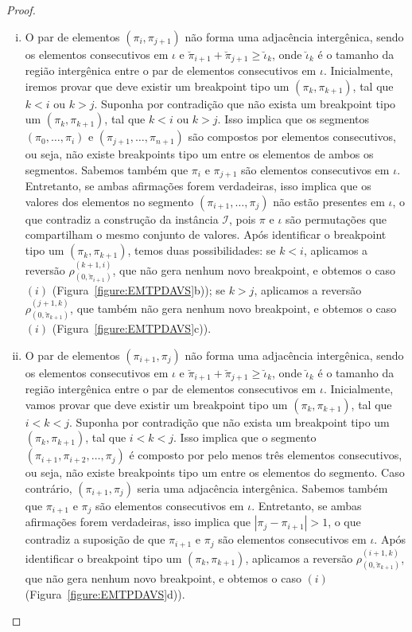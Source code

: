 \begin{proof}
\begin{enumerate}[i.]
    \item O par  de elementos $(\pi_i,\pi_{j+1})$ não forma uma adjacência intergênica, sendo os elementos consecutivos em $\iota$ e $\breve\pi_{i+1} + \breve\pi_{j+1} \ge \breve\iota_k$, onde $\breve\iota_k$ é o tamanho da região intergênica entre o par de elementos consecutivos em $\iota$. Inicialmente, iremos provar que deve existir um breakpoint tipo um $(\pi_k,\pi_{k+1})$, tal que $k < i$ ou $k > j$. Suponha por contradição que não exista um breakpoint tipo um $(\pi_k,\pi_{k+1})$, tal que $k < i$ ou $k > j$. Isso implica que os segmentos $(\pi_0,\dots,\pi_i)$ e $(\pi_{j+1},\dots,\pi_{n+1})$ são compostos por elementos consecutivos, ou seja, não existe breakpoints tipo um entre os elementos de ambos os segmentos. Sabemos também que $\pi_i$ e $\pi_{j+1}$ são elementos consecutivos em $\iota$. Entretanto, se ambas afirmações forem verdadeiras, isso implica que os valores dos elementos no segmento $(\pi_{i+1},\dots,\pi_j)$ não estão presentes em $\iota$, o que contradiz a construção da instância $\mathcal{I}$, pois $\pi$ e $\iota$ são permutações que compartilham o mesmo conjunto de valores. Após identificar o breakpoint tipo um $(\pi_k,\pi_{k+1})$, temos duas possibilidades: se $k < i$, aplicamos a reversão $\rho^{(k+1,i)}_{(0,\breve\pi_{i+1})}$, que não gera nenhum novo breakpoint, e obtemos o caso $(i)$ (Figura~\ref{figure:EMTPDAVS}b)); se $k > j$, aplicamos a reversão $\rho^{(j+1,k)}_{(0,\breve\pi_{k+1})}$, que também não gera nenhum novo breakpoint, e obtemos o caso $(i)$ (Figura~\ref{figure:EMTPDAVS}c)).
    \item O par de elementos $(\pi_{i+1},\pi_{j})$ não forma uma adjacência intergênica, sendo os elementos consecutivos em $\iota$ e $\breve\pi_{i+1} + \breve\pi_{j+1} \ge \breve\iota_k$, onde $\breve\iota_k$ é o tamanho da região intergênica entre o par de elementos consecutivos em $\iota$. Inicialmente, vamos provar que deve existir um breakpoint tipo um $(\pi_k,\pi_{k+1})$, tal que $i < k < j$. Suponha por contradição que não exista um breakpoint tipo um $(\pi_k,\pi_{k+1})$, tal que $i < k < j$. Isso implica que o segmento $(\pi_{i+1},\pi_{i+2},\dots,\pi_j)$ é composto por pelo menos três elementos consecutivos, ou seja, não existe breakpoints tipo um entre os elementos do segmento. Caso contrário, $(\pi_{i+1},\pi_{j})$ seria uma adjacência intergênica. Sabemos também que $\pi_{i+1}$ e $\pi_{j}$ são elementos consecutivos em $\iota$. Entretanto, se ambas afirmações forem verdadeiras, isso implica que $|\pi_j - \pi_{i+1}| > 1$, o que contradiz a suposição de que $\pi_{i+1}$ e $\pi_{j}$ são elementos consecutivos em $\iota$. Após identificar o breakpoint tipo um $(\pi_k,\pi_{k+1})$, aplicamos a reversão $\rho^{(i+1,k)}_{(0,\breve\pi_{k+1})}$, que não gera nenhum novo breakpoint, e obtemos o caso $(i)$ (Figura~\ref{figure:EMTPDAVS}d)).

\end{enumerate}
\end{proof}
